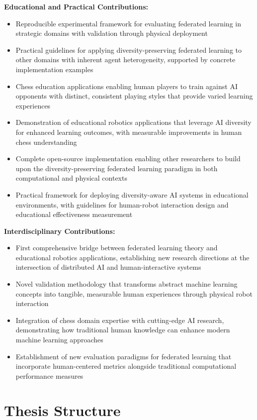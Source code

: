 \textbf{Educational and Practical Contributions:}
\begin{itemize}
\item Reproducible experimental framework for evaluating federated learning in strategic domains with validation through physical deployment
\item Practical guidelines for applying diversity-preserving federated learning to other domains with inherent agent heterogeneity, supported by concrete implementation examples
\item Chess education applications enabling human players to train against AI opponents with distinct, consistent playing styles that provide varied learning experiences
\item Demonstration of educational robotics applications that leverage AI diversity for enhanced learning outcomes, with measurable improvements in human chess understanding
\item Complete open-source implementation enabling other researchers to build upon the diversity-preserving federated learning paradigm in both computational and physical contexts
\item Practical framework for deploying diversity-aware AI systems in educational environments, with guidelines for human-robot interaction design and educational effectiveness measurement
\end{itemize}

\textbf{Interdisciplinary Contributions:}
\begin{itemize}
\item First comprehensive bridge between federated learning theory and educational robotics applications, establishing new research directions at the intersection of distributed AI and human-interactive systems
\item Novel validation methodology that transforms abstract machine learning concepts into tangible, measurable human experiences through physical robot interaction
\item Integration of chess domain expertise with cutting-edge AI research, demonstrating how traditional human knowledge can enhance modern machine learning approaches
\item Establishment of new evaluation paradigms for federated learning that incorporate human-centered metrics alongside traditional computational performance measures
\end{itemize}

\section{Thesis Structure}
\label{sec:structure}

